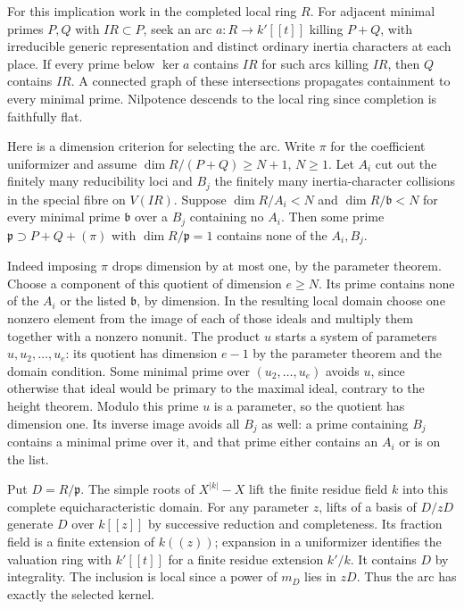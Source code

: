 \documentclass[11pt]{amsart}
\theoremstyle{definition}
\theoremstyle{remark}
\begin{document}
For this implication work in the completed local ring $R$. For
adjacent minimal primes $P,Q$ with $IR\subset P$, seek an arc
$a:R\to k'[[t]]$ killing $P+Q$, with irreducible generic representation
and distinct ordinary inertia characters at each place. If every prime
below $\ker a$ contains $IR$ for such arcs killing $IR$, then $Q$
contains $IR$. A connected graph of these intersections propagates
containment to every minimal prime. Nilpotence descends to the local
ring since completion is faithfully flat.

Here is a dimension criterion for selecting the arc. Write $\pi$
for the coefficient uniformizer and assume
$\dim R/(P+Q)\ge N+1$, $N\ge1$. Let $A_i$ cut out the finitely many
reducibility loci and $B_j$ the finitely many inertia-character
collisions in the special fibre on $V(IR)$. Suppose
$\dim R/A_i<N$ and $\dim R/\mathfrak b<N$ for every minimal
prime $\mathfrak b$ over a $B_j$ containing no $A_i$. Then some
prime $\mathfrak p\supset P+Q+(\pi)$ with $\dim R/\mathfrak p=1$
contains none of the $A_i,B_j$.

Indeed imposing $\pi$ drops dimension by at most one, by the
parameter theorem. Choose a component of this quotient of dimension
$e\ge N$. Its prime contains none of the $A_i$ or the listed
$\mathfrak b$, by dimension. In the resulting local domain choose
one nonzero element from the image of each of those ideals and
multiply them together with a nonzero nonunit. The product $u$
starts a system of parameters $u,u_2,\ldots,u_e$: its quotient has
dimension $e-1$ by the parameter theorem and the domain condition.
Some minimal prime over $(u_2,\ldots,u_e)$ avoids $u$, since otherwise
that ideal would be primary to the maximal ideal, contrary to the
height theorem. Modulo this prime $u$ is a parameter, so the quotient
has dimension one. Its inverse image avoids all $B_j$ as well:
a prime containing $B_j$ contains a minimal prime over it, and that
prime either contains an $A_i$ or is on the list.

Put $D=R/\mathfrak p$. The simple roots of $X^{|k|}-X$ lift the
finite residue field $k$ into this complete equicharacteristic
domain. For any parameter $z$, lifts of a basis of $D/zD$ generate
$D$ over $k[[z]]$ by successive reduction and completeness.
Its fraction field is a finite extension of $k((z))$; expansion in
a uniformizer identifies the valuation ring with $k'[[t]]$ for a
finite residue extension $k'/k$. It contains $D$ by integrality.
The inclusion is local since a power of $m_D$ lies in $zD$.
Thus the arc has exactly the selected kernel.
\end{document}
